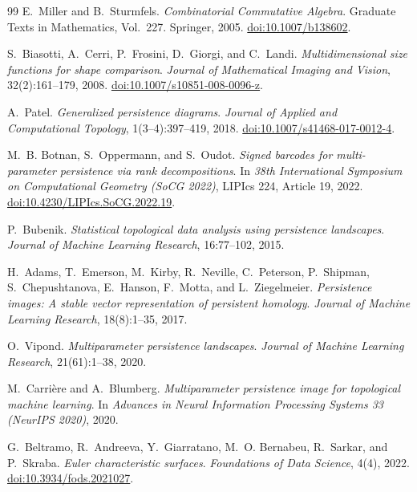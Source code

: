 \documentclass[11pt]{article}
\theoremstyle{definition}
\theoremstyle{remark}
\begin{document}
\begin{thebibliography}{99}
E.~Miller and B.~Sturmfels.
\newblock \emph{Combinatorial Commutative Algebra}.
\newblock Graduate Texts in Mathematics, Vol.~227. Springer, 2005.
\newblock \href{https://doi.org/10.1007/b138602}{doi:10.1007/b138602}.

S.~Biasotti, A.~Cerri, P.~Frosini, D.~Giorgi, and C.~Landi.
\newblock \emph{Multidimensional size functions for shape comparison}.
\newblock \emph{Journal of Mathematical Imaging and Vision}, 32(2):161--179, 2008.
\newblock \href{https://doi.org/10.1007/s10851-008-0096-z}{doi:10.1007/s10851-008-0096-z}.

A.~Patel.
\newblock \emph{Generalized persistence diagrams}.
\newblock \emph{Journal of Applied and Computational Topology}, 1(3--4):397--419, 2018.
\newblock \href{https://doi.org/10.1007/s41468-017-0012-4}{doi:10.1007/s41468-017-0012-4}.

M.~B. Botnan, S.~Oppermann, and S.~Oudot.
\newblock \emph{Signed barcodes for multi-parameter persistence via rank decompositions}.
\newblock In \emph{38th International Symposium on Computational Geometry (SoCG 2022)}, LIPIcs 224, Article 19, 2022.
\newblock \href{https://doi.org/10.4230/LIPIcs.SoCG.2022.19}{doi:10.4230/LIPIcs.SoCG.2022.19}.

P.~Bubenik.
\newblock \emph{Statistical topological data analysis using persistence landscapes}.
\newblock \emph{Journal of Machine Learning Research}, 16:77--102, 2015.

H.~Adams, T.~Emerson, M.~Kirby, R.~Neville, C.~Peterson, P.~Shipman, S.~Chepushtanova, E.~Hanson, F.~Motta, and L.~Ziegelmeier.
\newblock \emph{Persistence images: A stable vector representation of persistent homology}.
\newblock \emph{Journal of Machine Learning Research}, 18(8):1--35, 2017.

O.~Vipond.
\newblock \emph{Multiparameter persistence landscapes}.
\newblock \emph{Journal of Machine Learning Research}, 21(61):1--38, 2020.

M.~Carri\`ere and A.~Blumberg.
\newblock \emph{Multiparameter persistence image for topological machine learning}.
\newblock In \emph{Advances in Neural Information Processing Systems 33 (NeurIPS 2020)}, 2020.

G.~Beltramo, R.~Andreeva, Y.~Giarratano, M.~O. Bernabeu, R.~Sarkar, and P.~Skraba.
\newblock \emph{Euler characteristic surfaces}.
\newblock \emph{Foundations of Data Science}, 4(4), 2022.
\newblock \href{https://doi.org/10.3934/fods.2021027}{doi:10.3934/fods.2021027}.


\end{thebibliography}
\end{document}
